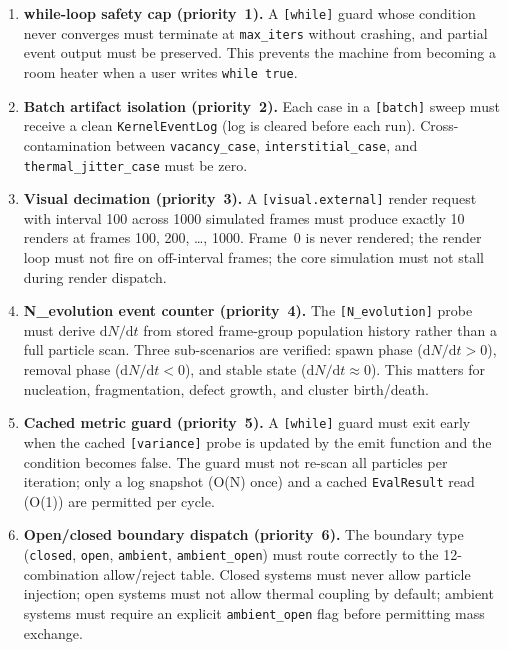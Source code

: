 \documentclass[11pt]{article}
\begin{document}
\begin{enumerate}
    \item \textbf{while-loop safety cap (priority~1).}  A
          \texttt{[while]} guard whose condition never converges must
          terminate at \texttt{max\_iters} without crashing, and partial
          event output must be preserved.  This prevents the machine from
          becoming a room heater when a user writes \texttt{while true}.
    \item \textbf{Batch artifact isolation (priority~2).}  Each case in a
          \texttt{[batch]} sweep must receive a clean \texttt{KernelEventLog}
          (log is cleared before each run).  Cross-contamination between
          \texttt{vacancy\_case}, \texttt{interstitial\_case}, and
          \texttt{thermal\_jitter\_case} must be zero.
    \item \textbf{Visual decimation (priority~3).}  A
          \texttt{[visual.external]} render request with interval 100
          across 1000 simulated frames must produce exactly 10 renders at
          frames 100, 200, \ldots, 1000.  Frame~0 is never rendered; the
          render loop must not fire on off-interval frames; the core
          simulation must not stall during render dispatch.
    \item \textbf{N\_evolution event counter (priority~4).}  The
          \texttt{[N\_evolution]} probe must derive $\mathrm{d}N/\mathrm{d}t$
          from stored frame-group population history rather than a full
          particle scan.  Three sub-scenarios are verified: spawn phase
          ($\mathrm{d}N/\mathrm{d}t > 0$), removal phase
          ($\mathrm{d}N/\mathrm{d}t < 0$), and stable state
          ($\mathrm{d}N/\mathrm{d}t \approx 0$).  This matters for
          nucleation, fragmentation, defect growth, and cluster birth/death.
    \item \textbf{Cached metric guard (priority~5).}  A
          \texttt{[while]} guard must exit early when the cached
          \texttt{[variance]} probe is updated by the emit function and
          the condition becomes false.  The guard must not re-scan all
          particles per iteration; only a log snapshot (O(N) once) and a
          cached \texttt{EvalResult} read (O(1)) are permitted per cycle.
    \item \textbf{Open/closed boundary dispatch (priority~6).}  The
          boundary type (\texttt{closed}, \texttt{open}, \texttt{ambient},
          \texttt{ambient\_open}) must route correctly to the 12-combination
          allow/reject table.  Closed systems must never allow particle
          injection; open systems must not allow thermal coupling by default;
          ambient systems must require an explicit \texttt{ambient\_open}
          flag before permitting mass exchange.
\end{enumerate}
\end{document}
